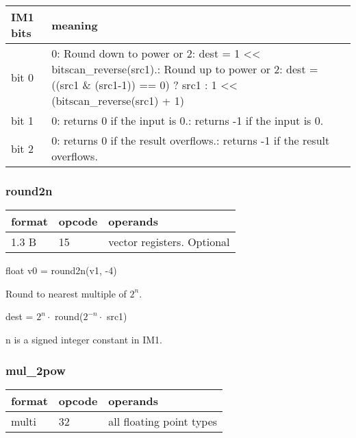 \documentclass[forwardcom.tex]{subfiles}
\begin{document}
\label{table:roundp2Options}
\begin{tabular}{|p{16mm}|p{122mm}|}
\hline
\bfseries IM1 bits & \bfseries meaning \\ \hline
bit 0 & 0: Round down to power or 2:\newline
dest = 1 \textless\textless{} bitscan\_reverse(src1).\newline
        1: Round up to power or 2:\newline
dest = ((src1 \& (src1-1)) == 0) ? src1 : 1 \textless\textless{}  (bitscan\_reverse(src1) + 1)
\\ \hline
bit 1 & 0: returns 0 if the input is 0.\newline
        1: returns -1 if the input is 0.\\ \hline
bit 2 & 0: returns 0 if the result overflows.\newline
        1: returns -1 if the result overflows.\\ \hline        
\end{tabular}
\vspace{2mm}


\subsubsection{round2n}
\label{table:round2nInstruction}
\begin{tabular}{|p{12mm}|p{12mm}|p{110mm}|}
\hline
\bfseries format & \bfseries opcode & \bfseries operands \\ \hline
1.3 B & 15 & vector registers. Optional \\ \hline
\end{tabular}
\vspace{2mm}

float v0 = round2n(v1, -4)
\vspace{2mm}

Round to nearest multiple of $2^n$.

dest = $2^n\cdot$ round($2^{-n}\cdot$ src1)

n is a signed integer constant in IM1.
\vspace{2mm}

\subsubsection{mul\_2pow}
\label{table:mul2PosInstruction}
\begin{tabular}{|p{12mm}|p{12mm}|p{110mm}|}
\hline
\bfseries format & \bfseries opcode & \bfseries operands \\ \hline
multi & 32 & all floating point types \\ \hline
\end{tabular}
\vspace{2mm}
\end{document}

